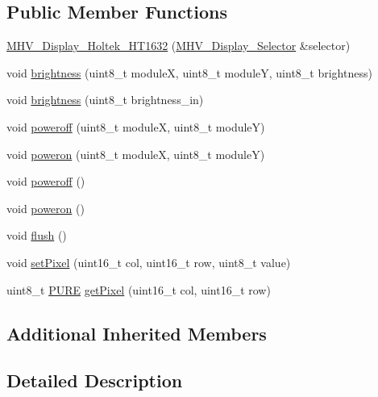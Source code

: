 \subsection*{Public Member Functions}
\begin{DoxyCompactItemize}
\item 
\hyperlink{class_m_h_v___display___holtek___h_t1632_a271dc10290ae8a2bbc4578f431ff5103}{M\-H\-V\-\_\-\-Display\-\_\-\-Holtek\-\_\-\-H\-T1632} (\hyperlink{class_m_h_v___display___selector}{M\-H\-V\-\_\-\-Display\-\_\-\-Selector} \&selector)
\item 
void \hyperlink{class_m_h_v___display___holtek___h_t1632_a43bfa1b6d39f82310cf8d31d42a85a1e}{brightness} (uint8\-\_\-t module\-X, uint8\-\_\-t module\-Y, uint8\-\_\-t brightness)
\item 
void \hyperlink{class_m_h_v___display___holtek___h_t1632_a375300263428f0a0352733a1187f9112}{brightness} (uint8\-\_\-t brightness\-\_\-in)
\item 
void \hyperlink{class_m_h_v___display___holtek___h_t1632_a96ddcd849f1700b2af3fdc7102e96dee}{poweroff} (uint8\-\_\-t module\-X, uint8\-\_\-t module\-Y)
\item 
void \hyperlink{class_m_h_v___display___holtek___h_t1632_a07fdf3074ccea021401990ae5b86c6b9}{poweron} (uint8\-\_\-t module\-X, uint8\-\_\-t module\-Y)
\item 
void \hyperlink{class_m_h_v___display___holtek___h_t1632_ad073676933ff09887596d84519bc1116}{poweroff} ()
\item 
void \hyperlink{class_m_h_v___display___holtek___h_t1632_af5afd1b8a02538b9ee9140838456e507}{poweron} ()
\item 
void \hyperlink{class_m_h_v___display___holtek___h_t1632_a97415c376825797182fabd1b19450a09}{flush} ()
\item 
void \hyperlink{class_m_h_v___display___holtek___h_t1632_a0018666e91fe69e6149e88b8b1419b7b}{set\-Pixel} (uint16\-\_\-t col, uint16\-\_\-t row, uint8\-\_\-t value)
\item 
uint8\-\_\-t \hyperlink{_m_h_v__io_8h_acd42770aecb025cfac170d4d3ace4544}{P\-U\-R\-E} \hyperlink{class_m_h_v___display___holtek___h_t1632_a671d27f1abbe9851063461a0f2ff4868}{get\-Pixel} (uint16\-\_\-t col, uint16\-\_\-t row)
\end{DoxyCompactItemize}
\subsection*{Additional Inherited Members}


\subsection{Detailed Description}
